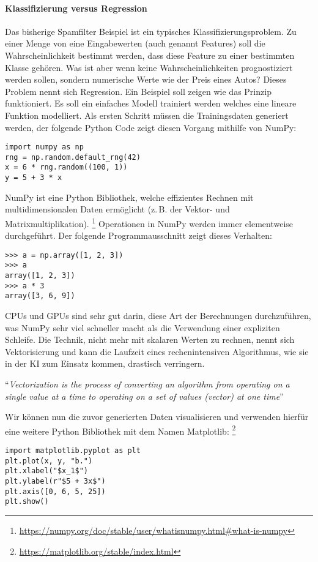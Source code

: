 \paragraph{Klassifizierung versus Regression}
Das bisherige Spamfilter Beispiel ist ein typisches
Klassifizierungsproblem. Zu einer Menge von eine Eingabewerten
(auch genannt Features) soll die Wahrscheinlichkeit bestimmt werden,
dass diese Feature zu einer bestimmten Klasse gehören.
Was ist aber wenn keine Wahrscheinlichkeiten
prognostiziert werden sollen, sondern numerische Werte wie
der Preis eines Autos? Dieses Problem nennt sich Regression.
Ein Beispiel soll zeigen wie das Prinzip funktioniert.
Es soll ein einfaches Modell trainiert werden welches eine lineare
Funktion modelliert. Als ersten Schritt müssen die Trainingsdaten generiert werden,
der folgende Python Code zeigt diesen Vorgang mithilfe von NumPy:
\begin{lstlisting}
import numpy as np
rng = np.random.default_rng(42)
x = 6 * rng.random((100, 1))
y = 5 + 3 * x
\end{lstlisting}
NumPy ist eine Python Bibliothek, welche effizientes Rechnen mit
multidimensionalen Daten ermöglicht (z.\,B. der Vektor- und Matrixmultiplikation).
\footnote{\url{https://numpy.org/doc/stable/user/whatisnumpy.html\#what-is-numpy}}
Operationen in NumPy werden immer elementweise durchgeführt. Der folgende Programmausschnitt
zeigt dieses Verhalten:
\begin{lstlisting}
>>> a = np.array([1, 2, 3])
>>> a
array([1, 2, 3])
>>> a * 3
array([3, 6, 9])
\end{lstlisting}
CPUs und GPUs sind sehr gut darin, diese Art der Berechnungen durchzuführen,
was NumPy sehr viel schneller macht als die Verwendung einer expliziten Schleife.
Die Technik, nicht mehr mit skalaren Werten zu rechnen,
nennt sich Vektorisierung und kann
die Laufzeit eines rechenintensiven Algorithmus,
wie sie in der KI zum Einsatz kommen, drastisch verringern.
\begin{aquote}{\parencite{online:vectorization}}
  \enquote{\textit{Vectorization is the process of converting an algorithm
      from operating on a single value at a time to
      operating on a set of values (vector) at one time}}
\end{aquote}
Wir können nun die zuvor generierten Daten visualisieren und verwenden hierfür
eine weitere Python Bibliothek mit dem Namen Matplotlib:
\footnote{\url{https://matplotlib.org/stable/index.html}}
\begin{lstlisting}
import matplotlib.pyplot as plt
plt.plot(x, y, "b.")
plt.xlabel("$x_1$")
plt.ylabel(r"$5 + 3x$")
plt.axis([0, 6, 5, 25])
plt.show()
\end{lstlisting}
